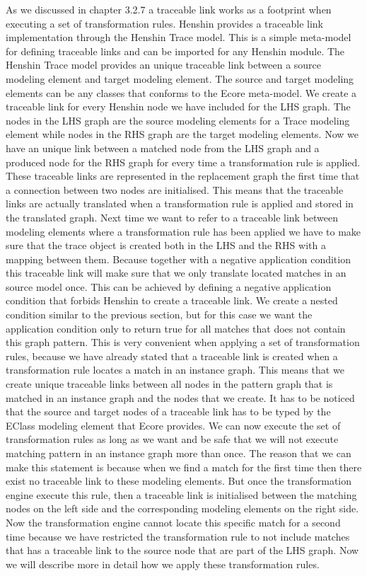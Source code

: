 As we discussed in chapter 3.2.7 a traceable link works as a footprint when
executing a set of transformation rules. Henshin provides a traceable link
implementation through the Henshin Trace model. This is a simple meta-model for
defining traceable links and can be imported for any Henshin module. The Henshin
Trace model provides an unique traceable
link between a source modeling element and target modeling element. The source
and target modeling elements can be any classes that conforms to the Ecore
meta-model. We create a traceable link for every Henshin node we have included
for the LHS graph. The nodes in the LHS graph are the source modeling elements
for a Trace modeling element while nodes in the RHS graph are the target
modeling elements. Now we have an unique link between a matched node from the
LHS graph and a produced node for the RHS graph for every time a transformation
rule is applied. These traceable links are represented in the replacement graph
the first time that a connection between two nodes are initialised. This means
that the traceable links are actually translated when a transformation rule is
applied and stored in the translated graph. Next time we want to refer to
a traceable link between modeling elements where a transformation rule has been
applied we have to make sure that the trace object is created both in the LHS
and the RHS with a mapping between them. Because together with a negative
application condition this traceable link will make sure that we only translate
located matches in an source model once. This can be achieved by defining a
negative application condition that forbids Henshin to create a traceable link.
We create a nested condition similar to the previous section, but for this case
we want the application condition only to return true for all matches that does
not contain this graph pattern. This is very convenient when applying a set of
transformation rules, because we have already stated that a traceable link is
created when a transformation rule locates a match in an instance graph. This
means that we create unique traceable links between all nodes in the pattern
graph that is matched in an instance graph and the nodes that we create. It has
to be noticed that the source and target nodes of a traceable link has to be
typed by the EClass modeling element that Ecore provides. We can now execute
the set of transformation rules as long as we want and be safe that we will not
execute matching pattern in an instance graph more than once. The reason that
we can make this statement is because when we find a match for the first time
then there exist no traceable link to these modeling elements. But once the
transformation engine execute this rule, then a traceable link is initialised
between the matching nodes on the left side and the corresponding modeling
elements on the right side. Now the transformation engine cannot 
locate this specific match for a second time because we have restricted the
transformation rule to not include matches that has a traceable link to the
source node that are part of the LHS graph. Now we will describe more in detail
how we apply these transformation rules.

